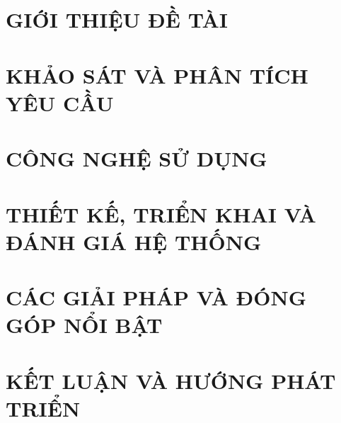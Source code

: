 \documentclass[a4paper, twoside]{report}
\renewcommand{\headrulewidth}{0pt} %
\theoremstyle{definition} %
\begin{document}
	
	
	
	\newpage
	
	\pagestyle{fancy}
	\fancyhf{}
	\fancyhead[RE, LO]{\leftmark}
	\fancyfoot[RE, LO]{\thepage}
	\renewcommand{\headrulewidth}{0.4pt}

	\chapter{GIỚI THIỆU ĐỀ TÀI}
	\label{chapter:Introduction}
	
	
	\newpage
	\chapter{KHẢO SÁT VÀ PHÂN TÍCH YÊU CẦU}
	\label{chapter:Related_works}
	
	
	
	\newpage
	\chapter{CÔNG NGHỆ SỬ DỤNG}
	\label{chapter:Methodology}
	
	
	\newpage
	\chapter{THIẾT KẾ, TRIỂN KHAI VÀ ĐÁNH GIÁ HỆ THỐNG}
	\label{chapter:Experiment}
	
	
	\newpage
	\chapter{CÁC GIẢI PHÁP VÀ ĐÓNG GÓP NỔI BẬT}
	\label{chapter:SolutionAndContribution}
	
	\newpage
	\chapter{KẾT LUẬN VÀ HƯỚNG PHÁT TRIỂN} %
	\label{chapter:conclusion}
	
	
\end{document}
